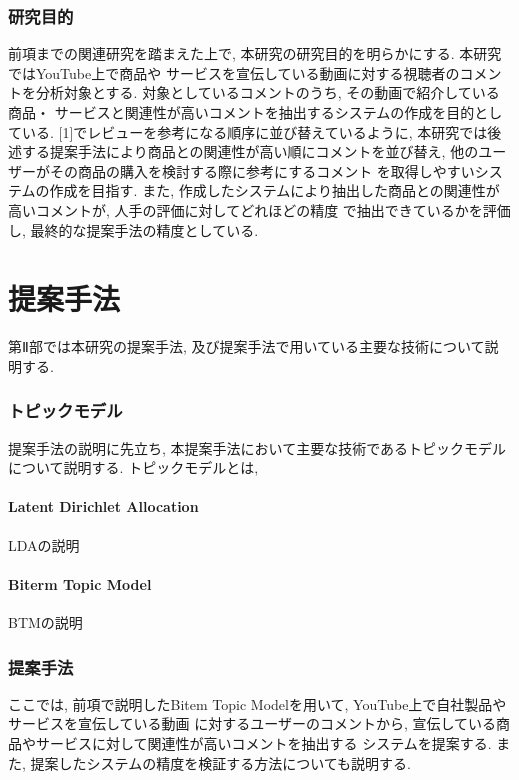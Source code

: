 \documentclass{ltjarticle}
\begin{document}
\newpage
\section{研究目的}
前項までの関連研究を踏まえた上で, 本研究の研究目的を明らかにする. 本研究ではYouTube上で商品や
サービスを宣伝している動画に対する視聴者のコメントを分析対象とする. 対象としているコメントのうち, その動画で紹介している商品・
サービスと関連性が高いコメントを抽出するシステムの作成を目的としている. [1]でレビューを参考になる順序に並び替えているように, 
本研究では後述する提案手法により商品との関連性が高い順にコメントを並び替え, 他のユーザーがその商品の購入を検討する際に参考にするコメント
を取得しやすいシステムの作成を目指す. また, 作成したシステムにより抽出した商品との関連性が高いコメントが, 人手の評価に対してどれほどの精度
で抽出できているかを評価し, 最終的な提案手法の精度としている. 

\newpage
\part{提案手法}
第Ⅱ部では本研究の提案手法, 及び提案手法で用いている主要な技術について説明する. 
\section{トピックモデル}
提案手法の説明に先立ち, 本提案手法において主要な技術であるトピックモデルについて説明する. トピックモデルとは, 
\subsection{Latent Dirichlet Allocation}
LDAの説明
\subsection{Biterm Topic Model}
BTMの説明

\newpage
\section{提案手法}
ここでは, 前項で説明したBitem Topic Modelを用いて, YouTube上で自社製品やサービスを宣伝している動画
に対するユーザーのコメントから, 宣伝している商品やサービスに対して関連性が高いコメントを抽出する
システムを提案する. また, 提案したシステムの精度を検証する方法についても説明する. 
\end{document}
